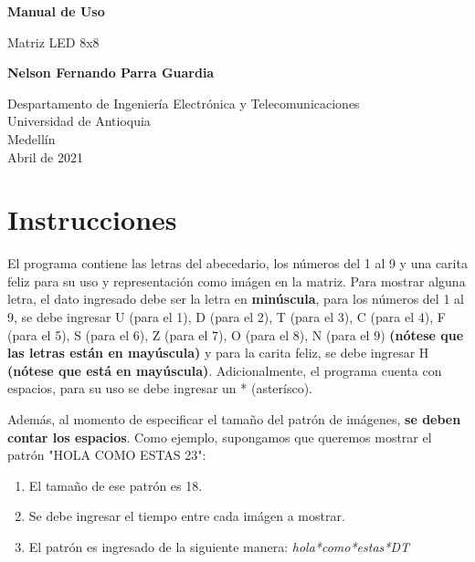\documentclass{article}
\begin{document}
\begin{titlepage}
    \begin{center}
        \vspace*{1cm}
            
        \Huge
        \textbf{Manual de Uso}
            
        \vspace{0.5cm}
        \LARGE
        Matriz LED 8x8
            
        \vspace{1.5cm}
            
        \textbf{Nelson Fernando Parra Guardia}
            
        \vfill
            
        \vspace{0.8cm}
            
        \Large
        Despartamento de Ingeniería Electrónica y Telecomunicaciones\\
        Universidad de Antioquia\\
        Medellín\\
        Abril de 2021
            
    \end{center}
\end{titlepage}

\newpage
\section{Instrucciones}
El programa contiene las letras del abecedario, los números del 1 al 9 y una carita feliz para su uso y representación como imágen en la matriz. Para mostrar alguna letra, el dato ingresado debe ser la letra en \textbf{minúscula}, para los números del 1 al 9, se debe ingresar U (para el 1), D (para el 2), T (para el 3), C (para el 4), F (para el 5), S (para el 6), Z (para el 7), O (para el 8), N (para el 9) \textbf{(nótese que las letras están en mayúscula)} y para la carita feliz, se debe ingresar H \textbf{(nótese que está en mayúscula)}. Adicionalmente, el programa cuenta con espacios, para su uso se debe ingresar un * (asterísco).
\par Además, al momento de especificar el tamaño del patrón de imágenes, \textbf{se deben contar los espacios}. Como ejemplo, supongamos que queremos mostrar el patrón "HOLA COMO ESTAS 23":

\begin{enumerate}
    \item El tamaño de ese patrón es 18.
    \item Se debe ingresar el tiempo entre cada imágen a mostrar.
    \item El patrón es ingresado de la siguiente manera: \emph{hola*como*estas*DT}
\end{enumerate}
\end{document}
